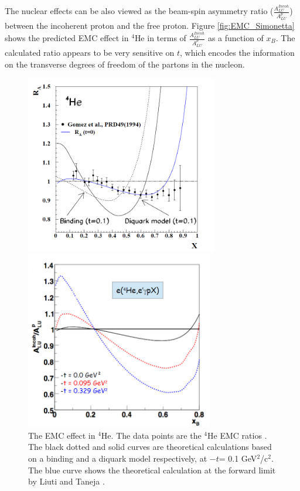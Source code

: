 The nuclear effects can be also viewed as the beam-spin asymmetry ratio ($\frac{A^{Incoh}_{LU}}{A^{p}_{LU}}$) between the incoherent proton and the free proton. Figure \ref{fig:EMC_Simonetta} shows the predicted EMC effect in $^4$He in terms of $\frac{A^{Incoh}_{LU}}{A^{p}_{LU}}$ as a function of $x_B$. The calculated ratio appears to be very sensitive on $t$, which encodes the information on the transverse degrees of freedom of the partons in the nucleon.\\

\begin{figure}[tbp]
\begin{minipage}[c]{.46\linewidth}
\includegraphics[height=7.8cm]{fig/4HeEMC_RA.png}
\caption{The EMC effect in $^4$He. The data points are the $^4$He EMC ratios \cite{He4_DIS_data}. The black dotted and solid curves are theoretical calculations based on a binding and a diquark model respectively, at $-t$= 0.1 GeV$^2$/c$^2$. The blue curve shows the theoretical calculation at the forward limit by Liuti and Taneja \cite{EMC_simonetta}.} 
\label{fig:4HeEMC_RA}
\end{minipage} \hfill
\begin{minipage}[c]{.46\linewidth}
\hspace{-0.3in}
\includegraphics[height=7.8cm]{fig/EMC_ALU_simonetta.png}

\end{minipage}
\end{figure}
